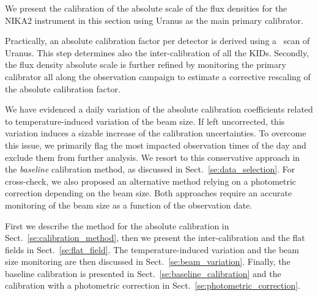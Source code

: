 
We present the calibration of the absolute scale of the flux densities
for the NIKA2 instrument in this section using Uranus as the main
primary calibrator.

Practically, %
{\lp an absolute calibration factor per detector} is derived using a \bm\ scan of
Uranus. This step determines also the inter-calibration of all the KIDs.%
Secondly, the flux density absolute scale is further refined by
monitoring the primary calibrator all along the observation campaign
to estimate
{\lp a corrective rescaling of the absolute calibration factor}.

We have evidenced a daily variation of the absolute calibration
coefficients related to temperature-induced variation of the beam
size.
If left uncorrected, this variation
induces a sizable increase of the calibration uncertainties. To
overcome this issue, we primarily flag the most impacted observation
times of the day and exclude them from further analysis. We resort to this
conservative approach in the \emph{baseline} calibration method, as
discussed in Sect.~\ref{se:data_selection}.
For cross-check,
we also proposed an alternative method relying on a photometric
correction depending on the beam size. Both approaches require an
accurate monitoring of the beam size as a function of the observation
date.

First we describe the method for the absolute calibration in
Sect.~\ref{se:calibration_method}, then we present the
inter-calibration and the flat fields in
Sect.~\ref{se:flat_field}. The temperature-induced variation and the
beam size monitoring are then discussed in
Sect.~\ref{se:beam_variation}. Finally, the baseline calibration is
presented in Sect.~\ref{se:baseline_calibration} and the calibration
with a photometric correction in
Sect.~\ref{se:photometric_correction}.  




